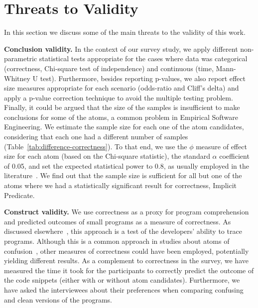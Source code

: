 \section{Threats to Validity}
\label{threat}

In this section we discuss some of the main threats to the validity of this work. 


\textbf{Conclusion validity.} 
In the context of our survey study, we apply different non-parametric statistical tests appropriate for the cases where data was categorical (correctness, Chi-square test of independence) and continuous (time, Mann-Whitney U test). Furthermore, besides reporting p-values, we also report effect size measures appropriate for each scenario (odds-ratio and Cliff's delta) and apply a p-value correction technique to avoid the multiple testing problem. Finally, it could be argued that the size of the samples is insufficient to make conclusions for some of the atoms, a common problem in Empirical Software Engineering. We estimate the sample size for each one of the atom candidates, considering that each one had a different number of samples (Table~\ref{tab:difference-correctness}). To that end, we use the $\phi$ measure of effect size for each atom (based on the Chi-square statistic), the standard $\alpha$ coefficient of 0.05, and set the expected statistical power to 0.8, as usually employed in the literature~\cite{Ellis:2010:EGE}. We find out that the sample size is sufficient for all but one of the atoms where we had a statistically significant result for correctness, Implicit Predicate. 


\textbf{Construct validity.} We use correctness as a proxy for program comprehension and predicted outcomes of small programs as a measure of correctness. As discussed elsewhere~\cite{Oliveira:2020:ECR}, this approach is a test of the developers' ability to trace programs. Although this is a common approach in studies about atoms of confusion~\cite{TheEyesDoNotLie,Langhout:2021:ACJ,DBLP:conf/sigsoft/GopsteinIYDZYC17}, other measures of correctness could have been employed, potentially yielding different results. As a complement to correctness in the survey, we have measured the time it took for the participants to correctly predict the outcome of the code snippets (either with or without atom candidates). Furthermore, we have  asked the interviewees about their preferences when comparing confusing and clean versions of the programs.

